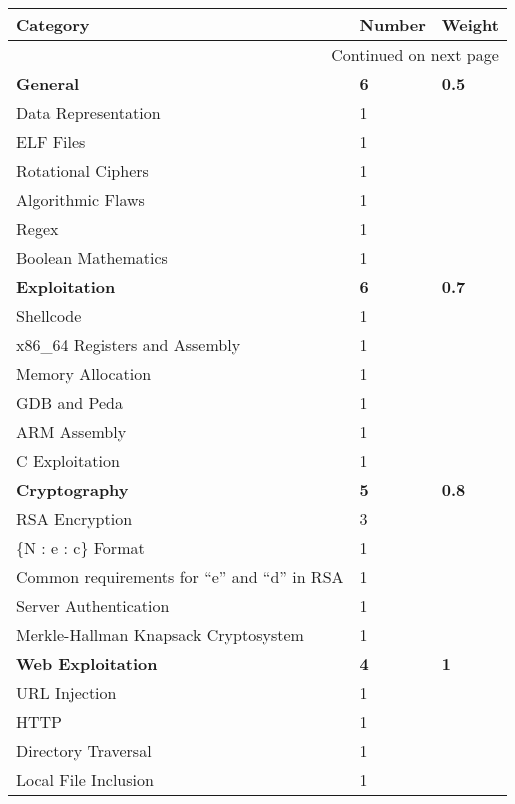 \documentclass[a4paper,11pt]{report}
\begin{document}
		\begin{center}
			\begin{longtable}{| l | l | l |}
				\hline
				\textbf{Category} & \textbf{Number} & \textbf{Weight} \\ \hline 
				\endhead
				\multicolumn{3}{|r|}{{Continued on next page}} \\ \hline
				\endfoot
				\endlastfoot
				\textbf{General} & \textbf{6} & \textbf{0.5} \\ \hline
				\quad Data Representation & 1 & \\ \hline
				\quad ELF Files & 1 & \\ \hline
				\quad Rotational Ciphers & 1 & \\ \hline
				\quad Algorithmic Flaws & 1 & \\ \hline 
				\quad Regex & 1 & \\ \hline 
				\quad Boolean Mathematics & 1 & \\ \hline 
				\textbf{Exploitation} & \textbf{6} & \textbf{0.7}\\ \hline
				\quad Shellcode & 1 & \\ \hline
				\quad x86\_64 Registers and Assembly & 1 & \\ \hline
				\quad Memory Allocation & 1 & \\ \hline
				\quad GDB and Peda & 1 & \\ \hline
				\quad ARM Assembly & 1 & \\ \hline
				\quad C Exploitation & 1 & \\ \hline 
				\textbf{Cryptography} & \textbf{5} & \textbf{0.8} \\ \hline
				\quad RSA Encryption & 3 & \\ \hline
				\qquad \{N : e : c\} Format & 1 & \\ \hline
				\qquad Common requirements for ``e'' and ``d'' in RSA & 1 & \\ \hline
				\quad Server Authentication & 1 & \\ \hline
				\quad Merkle-Hallman Knapsack Cryptosystem & 1 & \\ \hline
				\textbf{Web Exploitation} & \textbf{4} & \textbf{1} \\ \hline
				\quad URL Injection & 1 & \\ \hline
				\quad HTTP & 1 & \\ \hline 
				\quad Directory Traversal & 1 & \\ \hline
				\quad Local File Inclusion & 1 & \\ \hline 

\end{longtable}
\end{center}
\end{document}
